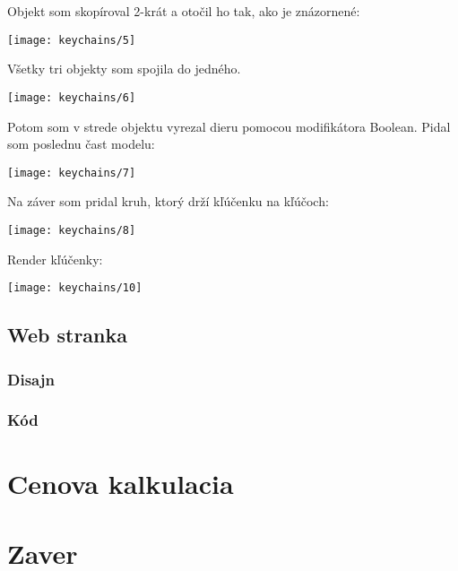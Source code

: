         Objekt som skopíroval 2-krát a otočil ho tak, ako je znázornené: \\
        \begin{center}
          \texttt{[image: keychains/5]}
        \end{center}

        Všetky tri objekty som spojila do jedného. \\
        \begin{center}
          \texttt{[image: keychains/6]}
        \end{center}

        Potom som v strede objektu vyrezal dieru pomocou modifikátora Boolean. Pidal som poslednu čast modelu: \\
        \begin{center}
          \texttt{[image: keychains/7]}
        \end{center}

        Na záver som pridal kruh, ktorý drží kľúčenku na kľúčoch: \\
        \begin{center}
          \texttt{[image: keychains/8]}
        \end{center}

        \newpage
        Render kľúčenky: \\
        \begin{center}
          \texttt{[image: keychains/10]}
        \end{center}

      \subsection{Web stranka}

      \subsubsection{Disajn}

      \subsubsection{Kód}

  \newpage
  \section{Cenova kalkulacia}

  \newpage
  \section{Zaver}

